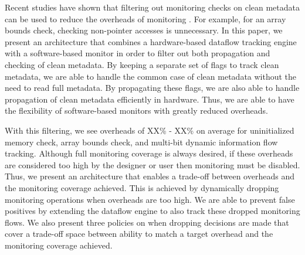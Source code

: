 
Recent studies have shown that filtering out monitoring checks on clean
metadata can be used to reduce the overheads of monitoring \cite{fade-hpca14}. For example, for
an array bounds check, checking non-pointer accesses is unnecessary. In this
paper, we present an architecture that combines a hardware-based dataflow
tracking engine with a software-based monitor in order to filter out both
propagation and checking of clean metadata. By keeping a separate set of flags
to track clean metadata, we are able to handle the common case of clean
metadata without the need to read full metadata. By propagating these flags, we
are also able to handle propagation of clean metadata efficiently in hardware.
Thus, we are able to have the flexibility of software-based monitors with
greatly reduced overheads.

With this filtering, we see overheads of XX\% - XX\% on average for
uninitialized memory check, array bounds check, and multi-bit dynamic
information flow tracking. Although full monitoring coverage is always desired,
if these overheads are considered too high by the designer or user then
monitoring must be disabled.
Thus, we present an architecture that enables a trade-off between overheads and
the monitoring coverage achieved. This is achieved by dynamically dropping
monitoring operations when overheads are too high. We are able to prevent false
positives by extending the dataflow engine to also track these dropped
monitoring flows. We also present three policies on when dropping decisions are
made that cover a trade-off space between ability to match a target overhead
and the monitoring coverage achieved.

